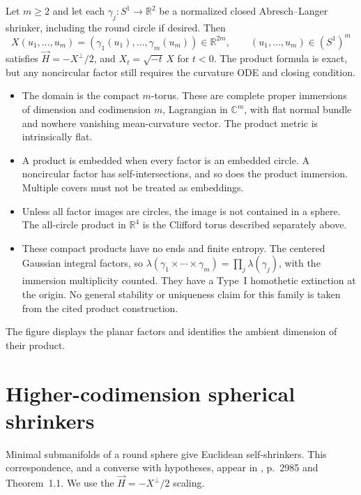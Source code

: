 \begin{example}\label{ex:catalogue-curve-products}
Let $m\geq2$ and let each
$\gamma_j:S^1\to\mathbb R^2$ be a normalized closed Abresch--Langer
shrinker, including the round circle if desired. Then
\[
 X(u_1,\ldots,u_m)
   =(\gamma_1(u_1),\ldots,\gamma_m(u_m))\in\mathbb R^{2m},
 \qquad (u_1,\ldots,u_m)\in(S^1)^m
\]
satisfies $\vec H=-X^\perp/2$, and $X_t=\sqrt{-t}\,X$ for $t<0$.
The product formula is exact, but any noncircular factor still requires
the curvature ODE and closing condition.
\begin{itemize}
\item The domain is the compact $m$-torus. These are complete proper
immersions of dimension and codimension $m$, Lagrangian in $\mathbb C^m$,
with flat normal bundle and nowhere vanishing mean-curvature vector.
The product metric is intrinsically flat.
\item A product is embedded when every factor is an embedded circle.
A noncircular factor has self-intersections, and so does the product
immersion. Multiple covers must not be treated as embeddings.
\item Unless all factor images are circles, the image is not contained
in a sphere. The all-circle product in $\mathbb R^4$ is the Clifford
torus described separately above.
\item These compact products have no ends and finite entropy. The centered Gaussian integral factors, so
$\lambda(\gamma_1\times\cdots\times\gamma_m)=\prod_j\lambda(\gamma_j)$,
with the immersion multiplicity counted. They have a Type~I
homothetic extinction at the origin. No general stability or uniqueness
claim for this family is taken from the cited product construction.
\end{itemize}
The figure displays the planar factors and identifies the ambient
dimension of their product.
\end{example}

\chapter{Higher-codimension spherical shrinkers}\label{sec:catalogue-spherical-minimal}
Minimal submanifolds of a round sphere give Euclidean self-shrinkers.
This correspondence, and a converse with hypotheses, appear in
\cite{CatSmoczyk2005}, p.~2985 and Theorem~1.1. We use the
$\vec H=-X^\perp/2$ scaling.

